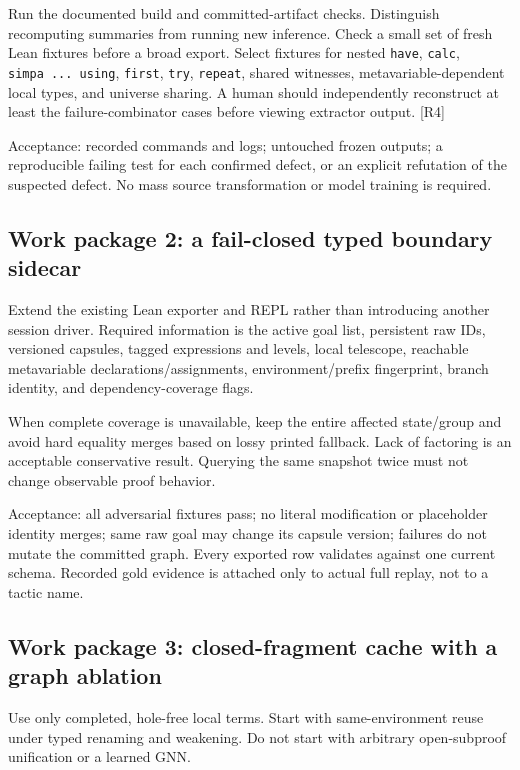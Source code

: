 \documentclass[
  10pt,
]{article}
\begin{document}
Run the documented build and committed-artifact checks. Distinguish
recomputing summaries from running new inference. Check a small set of
fresh Lean fixtures before a broad export. Select fixtures for nested
\texttt{have}, \texttt{calc}, \texttt{simpa\ ...\ using},
\texttt{first}, \texttt{try}, \texttt{repeat}, shared witnesses,
metavariable-dependent local types, and universe sharing. A human should
independently reconstruct at least the failure-combinator cases before
viewing extractor output. {[}R4{]}

Acceptance: recorded commands and logs; untouched frozen outputs; a
reproducible failing test for each confirmed defect, or an explicit
refutation of the suspected defect. No mass source transformation or
model training is required.

\subsection{Work package 2: a fail-closed typed boundary
sidecar}\label{work-package-2-a-fail-closed-typed-boundary-sidecar}

Extend the existing Lean exporter and REPL rather than introducing
another session driver. Required information is the active goal list,
persistent raw IDs, versioned capsules, tagged expressions and levels,
local telescope, reachable metavariable declarations/assignments,
environment/prefix fingerprint, branch identity, and dependency-coverage
flags.

When complete coverage is unavailable, keep the entire affected
state/group and avoid hard equality merges based on lossy printed
fallback. Lack of factoring is an acceptable conservative result.
Querying the same snapshot twice must not change observable proof
behavior.

Acceptance: all adversarial fixtures pass; no literal modification or
placeholder identity merges; same raw goal may change its capsule
version; failures do not mutate the committed graph. Every exported row
validates against one current schema. Recorded gold evidence is attached
only to actual full replay, not to a tactic name.

\subsection{Work package 3: closed-fragment cache with a graph
ablation}\label{work-package-3-closed-fragment-cache-with-a-graph-ablation}

Use only completed, hole-free local terms. Start with same-environment
reuse under typed renaming and weakening. Do not start with arbitrary
open-subproof unification or a learned GNN.
\end{document}
